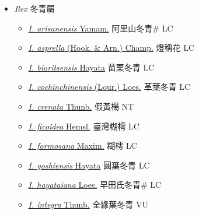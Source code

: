 
  \begin{itemize}
 \item[] \textit{Ilex} 冬青屬
                    
  \begin{itemize}
        \item[] \href{http://www.theplantlist.org/tpl1.1/search?q=Ilex+arisanensis}{\textit{I. arisanensis} Yamam.}   阿里山冬青\# LC
        \item[] \href{http://www.theplantlist.org/tpl1.1/search?q=Ilex+asprella}{\textit{I. asprella} (Hook. \& Arn.) Champ.}   燈稱花 LC
        \item[] \href{http://www.theplantlist.org/tpl1.1/search?q=Ilex+bioritsensis}{\textit{I. bioritsensis} Hayata}   苗栗冬青 LC
        \item[] \href{http://www.theplantlist.org/tpl1.1/search?q=Ilex+cochinchinensis}{\textit{I. cochinchinensis} (Lour.) Loes.}   革葉冬青 LC
        \item[] \href{http://www.theplantlist.org/tpl1.1/search?q=Ilex+crenata}{\textit{I. crenata} Thunb.}   假黃楊 NT
        \item[] \href{http://www.theplantlist.org/tpl1.1/search?q=Ilex+ficoidea}{\textit{I. ficoidea} Hemsl.}   臺灣糊樗 LC
        \item[] \href{http://www.theplantlist.org/tpl1.1/search?q=Ilex+formosana}{\textit{I. formosana} Maxim.}   糊樗 LC
        \item[] \href{http://www.theplantlist.org/tpl1.1/search?q=Ilex+goshiensis}{\textit{I. goshiensis} Hayata}   圓葉冬青 LC
        \item[] \href{http://www.theplantlist.org/tpl1.1/search?q=Ilex+hayataiana}{\textit{I. hayataiana} Loes.}   早田氏冬青\# LC
        \item[] \href{http://www.theplantlist.org/tpl1.1/search?q=Ilex+integra}{\textit{I. integra} Thunb.}   全緣葉冬青 VU

\end{itemize}
\end{itemize}
